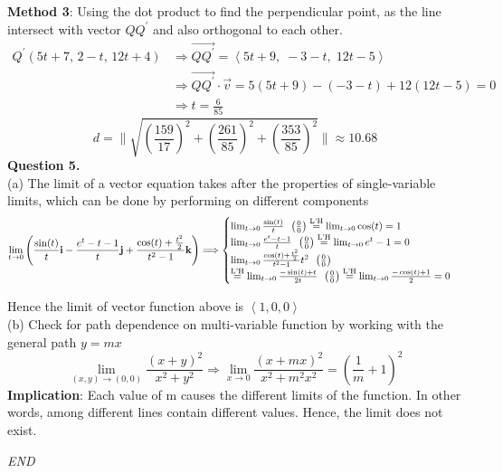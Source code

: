 \documentclass[a4paper]{exam}
\begin{document}
	\hspace*{2mm} \textbf{Method 3}: Using the dot product to find the perpendicular point, as the line intersect with vector $QQ^{\prime}$ and also orthogonal to each other.
	\begin{align*}
		Q^{\prime}(5t + 7,\, 2 - t,\, 12t + 4) 
		&\Longrightarrow \vec{QQ^{\prime}} = \left\langle 5t + 9,\; -3 - t,\; 12t - 5 \right\rangle \\
		&\Longrightarrow \vec{QQ^{\prime}} \cdot \vec{v} 
		= 5(5t + 9) - (-3 - t) + 12(12t - 5) = 0 \\
		&\Longrightarrow t = \frac{6}{85}
	\end{align*}
	$$\boxed{d = \| \sqrt{\left(\frac{159}{17}\right)^{2} + \left(\frac{261}{85}\right)^{2} + \left(\frac{353}{85}\right)^{2}} \| \approx 10.68}$$
	\noindent \textbf{Question 5.} \\[0.5em] 
	\noindent (a) The limit of a vector equation takes after the properties of single-variable limits, which can be done by performing on different components \\[0.5em]
	$$ \lim_{t \to 0} \left(\frac{\sin(t)}{t}\mathbf{i} - \frac{e^{t} - t - 1}{t}\mathbf{j} + \frac{\cos(t) + \frac{t^{2}}{2}}{t^{2} - 1} \mathbf{k} \right) \Longrightarrow 
	\begin{cases}
		\lim_{t \to 0} \frac{\sin(t)}{t} \hspace*{0.5em} \left( \frac{0}{0} \right) \overset{\text{L'H}}{=} \lim_{t \to 0} \cos(t) = 1 \\
		\lim_{t \to 0} \frac{e^{t} - t - 1}{t} \hspace*{0.5em} \left( \frac{0}{0} \right) \overset{\text{L'H}}{=} \lim_{t \to 0} e^{t} - 1 = 0 \\
		\lim_{t \to 0} \frac{\cos(t) + \frac{t^{2}}{2}}{t^{2} - 1}{t^{2}} \hspace*{0.5em} \left( \frac{0}{0} \right) \\
		\overset{\text{L'H}}{=} \lim_{t \to 0} \frac{-\sin(t) + t}{2t} \hspace*{0.5em} \left( \frac{0}{0} \right) \overset{\text{L'H}}{=} \lim_{t \to 0} \frac{-\cos(t) + 1}{2} = 0 \\
	\end{cases} $$
	
	\noindent Hence the limit of vector function above is $\left\langle 1, 0, 0 \right\rangle$\\[0.5em]
	\noindent (b) Check for path dependence on multi-variable function by working with the general path $y = mx$
	$$\lim_{(x, y) \to (0, 0)} \frac{(x + y)^{2}}{x^{2} + y^{2}} \Longrightarrow \lim_{x \to 0} \frac{(x + mx)^{2}}{x^{2} + m^{2}x^{2}} = \left( \frac{1}{m} + 1 \right)^{2}$$
	\noindent \textbf{Implication}: Each value of m causes the different limits of the function. In other words, among different lines contain different values. Hence, the limit does not exist.
	
	\vspace*{2mm}
	\begin{center}
		\textit{\large{END}}
	\end{center}
	
\end{document}
